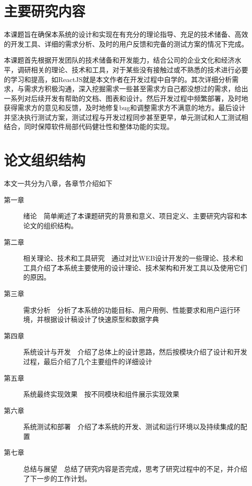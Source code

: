 \section{主要研究内容}
本课题旨在确保本系统的设计和实现在有充分的理论指导、充足的技术储备、高效的开发工具、详细的需求分析、及时的用户反馈和完备的测试方案的情况下完成。

本课题首先根据开发团队的技术储备和开发能力，结合公司的企业文化和经济水平，调研相关的理论、技术和工具，对于某些没有接触过或不熟悉的技术进行必要的学习和提高，如ReactJS就是本文作者在开发过程中自学的。其次详细分析需求，与需求方积极沟通，深入挖掘需求一些甚至需求方自己都没想过的需求，给出一系列对后续开发有帮助的文档、图表和设计。然后开发过程中频繁部署，及时地获得需求方的意见和反馈，及时地修复bug和调整需求方不满意的地方。最后设计并坚决执行测试方案，测试过程与开发过程同步甚至更早，单元测试和人工测试相结合，同时保障软件局部代码健壮性和整体功能的实现。

\section{论文组织结构}
本文一共分为八章，各章节介绍如下
\begin{description}
    \item[第一章] 绪论~~简单阐述了本课题研究的背景和意义、项目定义、主要研究内容和本论文的组织结构。
    \item[第二章] 相关理论、技术和工具研究~~通过对比WEB设计开发的一些理论、技术和工具介绍了本系统主要使用的设计理论、技术架构和开发工具以及使用它们的原因。
    \item[第三章] 需求分析~~分析了本系统的功能目标、用户用例、性能要求和用户运行环境，并根据设计稿设计了快速原型和数据字典
    \item[第四章] 系统设计与开发~~介绍了总体上的设计思路，然后按模块介绍了设计和开发过程，最后介绍了几个主要组件的详细设计
    \item[第五章] 系统最终实现效果~~按不同模块和组件展示实现效果
    \item[第六章] 系统测试和部署~~介绍了本系统的开发、测试和运行环境以及持续集成的配置
    \item[第七章] 总结与展望~~总结了研究内容是否完成，思考了研究过程中的不足，并介绍了下一步的工作计划。
\end{description}
